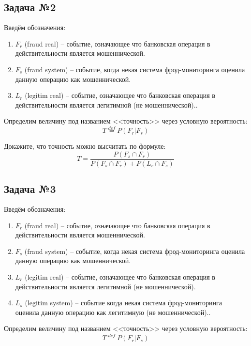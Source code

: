 \documentclass[english,russian,12pt]{article}
\begin{document}
\subsection*{Задача №2}
Введём обозначения:
\begin{enumerate}
	\item $F_r$ (fraud real) -- событие, означающее что банковская операция в действительности является мошеннической. 
	\item $F_s$ (fraud system) -- событие, когда некая система фрод-мониторинга оценила данную операцию как мошеннической.
	\item $L_r$ (legitim real) -- событие, означающее что банковская операция в действительности является легитимной (не мошеннической).. 
\end{enumerate}

Определим величину под названием <<точность>> через условную вероятность:
\begin{equation}
T \stackrel{def}{=} P(F_r | F_s)
\end{equation}

Докажите, что точность можно высчитать по формуле:
\begin{equation}
T = \frac{P(F_s \cap F_r)}{P(F_s \cap F_r) + P(L_r \cap F_s)}
\end{equation}


\subsection*{Задача №3}
Введём обозначения:
\begin{enumerate}
	\item $F_r$ (fraud real) -- событие, означающее что банковская операция в действительности является мошеннической. 
	\item $F_s$ (fraud system) -- событие, когда некая система фрод-мониторинга оценила данную операцию как мошеннической.
	\item $L_r$ (legitim real) -- событие, означающее что банковская операция в действительности является легитимной (не мошеннической).
 	\item $L_s$ (legitim system) -- событие когда некая система фрод-мониторинга оценила данную операцию как легитимную (не мошеннической).. 
\end{enumerate}

Определим величину под названием <<точность>> через условную вероятность:
\begin{equation}
T \stackrel{def}{=} P(F_r | F_s)
\end{equation}
\end{document}
